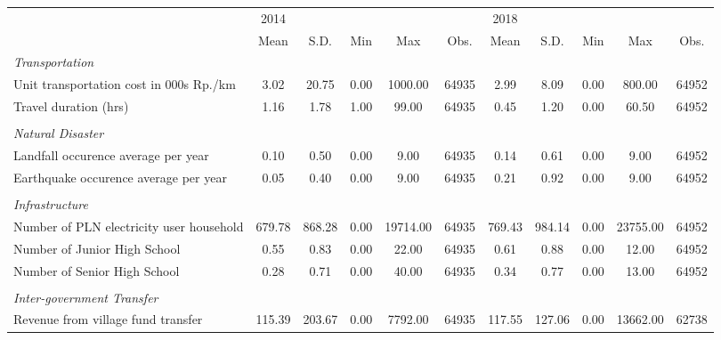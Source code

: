 \begin{tabular}{l*{2}{ccccc}}
\toprule
                &     2014&         &         &         &         &     2018&         &         &         &         \\
                &     Mean&     S.D.&      Min&      Max&     Obs.&     Mean&     S.D.&      Min&      Max&     Obs.\\
\midrule
\emph{Transportation}&         &         &         &         &         &         &         &         &         &         \\
\hspace{0.25cm} Unit transportation cost in 000s Rp./km&     3.02&    20.75&     0.00&  1000.00&    64935&     2.99&     8.09&     0.00&   800.00&    64952\\
\hspace{0.25cm} Travel duration (hrs)&     1.16&     1.78&     1.00&    99.00&    64935&     0.45&     1.20&     0.00&    60.50&    64952\\
\vspace{0.05em} \\ \emph{Natural Disaster}&         &         &         &         &         &         &         &         &         &         \\
\hspace{0.25cm} Landfall occurence average per year&     0.10&     0.50&     0.00&     9.00&    64935&     0.14&     0.61&     0.00&     9.00&    64952\\
\hspace{0.25cm} Earthquake occurence average per year&     0.05&     0.40&     0.00&     9.00&    64935&     0.21&     0.92&     0.00&     9.00&    64952\\
\vspace{0.05em} \\ \emph{Infrastructure}&         &         &         &         &         &         &         &         &         &         \\
\hspace{0.25cm} Number of PLN electricity user household&   679.78&   868.28&     0.00& 19714.00&    64935&   769.43&   984.14&     0.00& 23755.00&    64952\\
\hspace{0.25cm} Number of Junior High School&     0.55&     0.83&     0.00&    22.00&    64935&     0.61&     0.88&     0.00&    12.00&    64952\\
\hspace{0.25cm} Number of Senior High School&     0.28&     0.71&     0.00&    40.00&    64935&     0.34&     0.77&     0.00&    13.00&    64952\\
\vspace{0.05em} \\ \emph{Inter-government Transfer}&         &         &         &         &         &         &         &         &         &         \\
\hspace{0.25cm} Revenue from village fund transfer&   115.39&   203.67&     0.00&  7792.00&    64935&   117.55&   127.06&     0.00& 13662.00&    62738\\
\bottomrule
\end{tabular}
